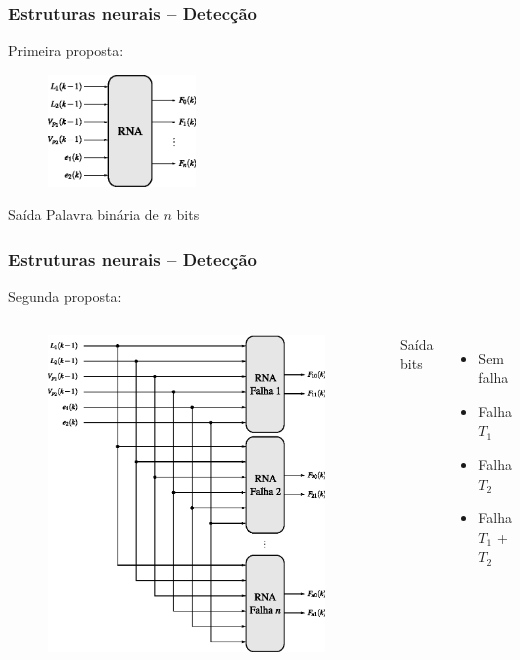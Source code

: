 \documentclass{beamer}
\begin{document}
\begin{frame}
    \frametitle{Estruturas neurais -- Detecção}

    Primeira proposta:
\begin{figure}[htb]
\centering
    \includegraphics[width=0.35\textwidth]{imgs/sistema/eps/detec_prop_1}
\end{figure}

    Saída \implica Palavra binária de $n$ bits
    
\end{frame}

\begin{frame}
    \frametitle{Estruturas neurais -- Detecção}

    Segunda proposta:

\begin{columns}
\begin{figure}[htb]
\centering
    \includegraphics[width=0.95\textwidth]{imgs/sistema/eps/detec_prop_2}
\end{figure}

    Saída  bits 
\begin{itemize}
    \item Sem falha
    \item Falha $T_1$
    \item Falha $T_2$
    \item Falha $T_1$ + $T_2$
\end{itemize}
\end{columns}
\end{frame}
\end{document}
